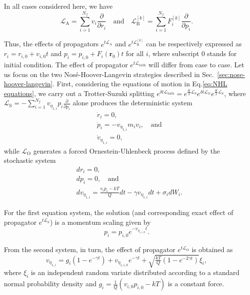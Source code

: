 \documentclass[
aip,
jcp,
reprint,
]{revtex4-1}
\newcommand{\vt}[1]{\boldsymbol{\mathbf{#1}}}          %
\newcommand{\diff}[2]{\frac{\partial #2}{\partial #1}} %
\newcommand{\Liu}{\mathcal{L}}
\begin{document}
In all cases considered here, we have
\begin{equation*}
\mathcal{L}_\mathrm{A} = \sum_{i=1}^{N_f} v_i \diff{r_i}{} \quad \mathrm{and} \quad
\mathcal{L}_\mathrm{B}^{[k]} = \sum_{i=1}^{N_f} F^{[k]}_i \diff{p_i}{}.
\end{equation*}

Thus, the effects of propagators $e^{t \mathcal{L}_\mathrm{A}}$ and $e^{t \mathcal{L}_\mathrm{B}^{[k]}}$ can be respectively expressed as $r_i = r_{i, 0} + v_{i, 0} t$ and $p_i = p_{i, 0} + F_i(\vt r_0) t$ for all $i$, where subscript $0$ stands for initial condition.
The effect of propagator $e^{t \Liu_\mathrm{bath}}$ will differ from case to case.
Let us focus on the two Nos\'{e}-Hoover-Langevin strategies described in Sec.~\ref{sec:nose-hoover-langevin}.
First, considering the equations of motion in Eq.\eqref{eq:NHL equations}, we carry out a Trotter-Suzuki splitting $e^{\delta t \Liu_\mathrm{bath}} = e^{\frac{\delta t}{2} \mathcal{L}_\mathrm{S}} e^{\delta t \mathcal{L}_\mathrm{O}} e^{\frac{\delta t}{2} \mathcal{L}_\mathrm{S}}$, where $\mathcal{L}_\mathrm{S} = - \sum_{i=1}^{N_f} v_{\eta_{1,i}} p_i \diff{p_i}{}$ alone produces the deterministic system
\begin{align*}
&\dot{r}_i = 0, \\
&\dot{p}_i = - v_{\eta_{1,i}} m_i v_i, \quad \mathrm{and} \\
&\dot{v}_{\eta_{1,i}} = 0,
\end{align*}
while $\mathcal{L}_\mathrm{O}$ generates a forced Ornestein-Uhlenbeck process defined by the stochastic system
\begin{align*}
&dr_i = 0, \\
&dp_i = 0, \quad \mathrm{and} \\
&dv_{\eta_{1, i}} = \frac{v_i p_i - kT}{Q}dt - \gamma v_{\eta_{1, i}}dt + \sigma_i dW_i.
\end{align*}

For the first equation system, the solution (and corresponding exact effect of propagator $e^{t \mathcal{L}_\mathrm{S}}$) is a momentum scaling given by
\begin{equation*}
p_i = p_{i,0} e^{-v_{\eta_{1,i,0}} t}.
\end{equation*}

From the second system, in turn, the effect of propagator $e^{t \mathcal{L}_\mathrm{O}}$ is obtained as
\begin{equation*}
v_{\eta_{1, i}} = g_i (1 - e^{-\gamma t})
+ v_{\eta_{1,i,0}} e^{-\gamma t} + \sqrt{\tfrac{kT}{Q}(1 - e^{-2\gamma t})} \xi_i,
\end{equation*}
where $\xi_i$ is an independent random variate distributed according to a standard normal probability density and $g_i = \frac{1}{Q}(v_{i,0} p_{i,0} - kT)$ is a constant force.
\end{document}
